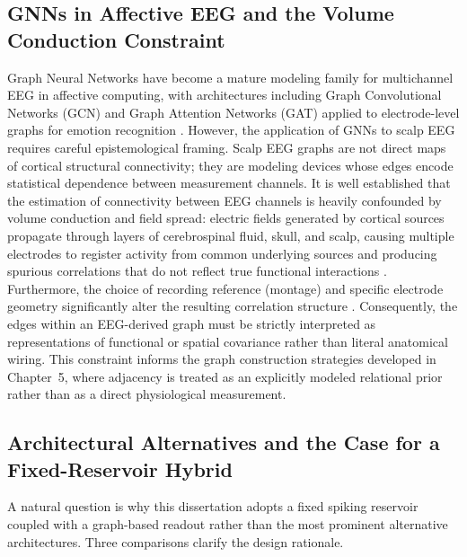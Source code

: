 \subsection{GNNs in Affective EEG and the Volume Conduction Constraint}
\label{sec:volume_conduction}
Graph Neural Networks have become a mature modeling family for multichannel EEG in affective computing, with architectures including Graph Convolutional Networks (GCN) and Graph Attention Networks (GAT) applied to electrode-level graphs for emotion recognition \cite{Jia2024GNNEEGSentiment}. However, the application of GNNs to scalp EEG requires careful epistemological framing. Scalp EEG graphs are not direct maps of cortical structural connectivity; they are modeling devices whose edges encode statistical dependence between measurement channels. It is well established that the estimation of connectivity between EEG channels is heavily confounded by volume conduction and field spread: electric fields generated by cortical sources propagate through layers of cerebrospinal fluid, skull, and scalp, causing multiple electrodes to register activity from common underlying sources and producing spurious correlations that do not reflect true functional interactions \cite{nunez_srinivasan_2006}. Furthermore, the choice of recording reference (montage) and specific electrode geometry significantly alter the resulting correlation structure \cite{yao_2001}. Consequently, the edges within an EEG-derived graph must be strictly interpreted as representations of functional or spatial covariance rather than literal anatomical wiring. This constraint informs the graph construction strategies developed in Chapter~5, where adjacency is treated as an explicitly modeled relational prior rather than as a direct physiological measurement.

\subsection{Architectural Alternatives and the Case for a Fixed-Reservoir Hybrid}
\label{sec:architectural_comparison}
A natural question is why this dissertation adopts a fixed spiking reservoir coupled with a graph-based readout rather than the most prominent alternative architectures. Three comparisons clarify the design rationale.

